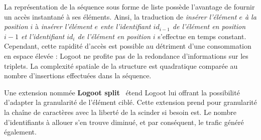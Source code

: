 \noindent La représentation de la séquence sous forme de liste possède
l'avantage de fournir un accès instantané à ses éléments. Ainsi, la traduction
de \emph{insérer l'élément $e$ à la position $i$} à \emph{insérer l'élément $e$
  ente l'identifiant $id_{i-1}$ de l'élément en position $i-1$ et l'identifiant
  $id_i$ de l'élément en position $i$} s'effectue en temps constant.  Cependant,
cette rapidité d'accès est possible au détriment d'une consommation en espace
élevée : Logoot ne profite pas de la redondance d'informations sur les
triplets. La complexité spatiale de la structure est quadratique comparée au
nombre d'insertions effectuées dans la séquence.

\noindent Une extension nommée \textbf{Logoot split}~\cite{andre2013supporting}
étend Logoot lui offrant la possibilité d'adapter la granularité de l'élément
ciblé.  Cette extension prend pour granularité la chaîne de caractères avec la
liberté de la scinder si besoin est. Le nombre d'identifiants à allouer s'en
trouve diminué, et par conséquent, le trafic généré également.


